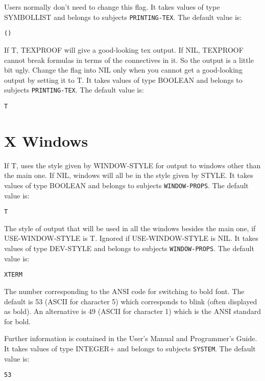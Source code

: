 \begin{description}
Users normally don't need to change this flag.
It takes values of type SYMBOLLIST and belongs to subjects \texttt{PRINTING-TEX}.  The default value is: \begin{lstlisting}
()
\end{lstlisting}

\item[TEX-MIMIC-SCRIBE]  
If T, TEXPROOF will give a good-looking tex output.
If NIL, TEXPROOF cannot break formulas in terms of the connectives in it.
So the output is a little bit ugly. Change the flag into NIL only when you
cannot get a good-looking output by setting it to T.
It takes values of type BOOLEAN and belongs to subjects \texttt{PRINTING-TEX}.  The default value is: \begin{lstlisting}
T
\end{lstlisting}

\item
\end{description}

\section{X Windows}

\begin{description} 
\item[USE-WINDOW-STYLE]  
If T, uses the style given by WINDOW-STYLE for output
to windows other than the main one. If NIL, windows will all be
in the style given by STYLE.
It takes values of type BOOLEAN and belongs to subjects \texttt{WINDOW-PROPS}.  The default value is: \begin{lstlisting}
T
\end{lstlisting}

\item[WINDOW-STYLE]  
The style of output that will be used in all the windows
besides the main one, if USE-WINDOW-STYLE is T. Ignored if
USE-WINDOW-STYLE is NIL.
It takes values of type DEV-STYLE and belongs to subjects \texttt{WINDOW-PROPS}.  The default value is: \begin{lstlisting}
XTERM
\end{lstlisting}

\item[XTERM-ANSI-BOLD]  
The number corresponding to the ANSI code for switching to bold font.
The default is 53 (ASCII for character 5) which corresponds to blink (often displayed as bold).
An alternative is 49 (ASCII for character 1) which is the ANSI standard for bold.

Further information is contained in the User's Manual and Programmer's Guide.
It takes values of type INTEGER+ and belongs to subjects \texttt{SYSTEM}.  The default value is: \begin{lstlisting}
53
\end{lstlisting}

\item
\end{description}

